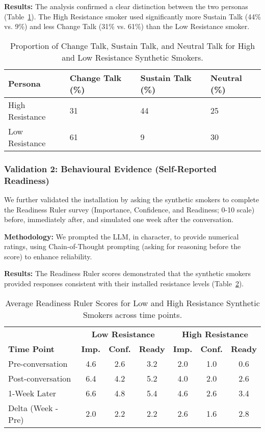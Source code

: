 \textbf{Results:} The analysis confirmed a clear distinction between the two personas (Table~\ref{tab:resistance-ct-st}). The High Resistance smoker used significantly more Sustain Talk (44\% vs. 9\%) and less Change Talk (31\% vs. 61\%) than the Low Resistance smoker.

\begin{table}[h!]
\centering
\caption{Proportion of Change Talk, Sustain Talk, and Neutral Talk for High and Low Resistance Synthetic Smokers.}
\label{tab:resistance-ct-st}
\begin{tabular}{@{}llll@{}}
\toprule
\textbf{Persona} & \textbf{Change Talk (\%)} & \textbf{Sustain Talk (\%)} & \textbf{Neutral (\%)} \\ \midrule
High Resistance & 31 & 44 & 25 \\
Low Resistance & 61 & 9 & 30 \\ \bottomrule
\end{tabular}
\end{table}

\subsubsection{Validation 2: Behavioural Evidence (Self-Reported Readiness)}

We further validated the installation by asking the synthetic smokers to complete the Readiness Ruler survey (Importance, Confidence, and Readiness; 0-10 scale) before, immediately after, and simulated one week after the conversation.

\textbf{Methodology:} We prompted the LLM, in character, to provide numerical ratings, using Chain-of-Thought prompting (asking for reasoning before the score) to enhance reliability.

\textbf{Results:} The Readiness Ruler scores demonstrated that the synthetic smokers provided responses consistent with their installed resistance levels (Table~\ref{tab:resistance-readiness-rulers}).

\begin{table}[h!]
\centering
\caption{Average Readiness Ruler Scores for Low and High Resistance Synthetic Smokers across time points.}
\label{tab:resistance-readiness-rulers}
\begin{tabular}{@{}l|ccc|ccc@{}}
\toprule
 & \multicolumn{3}{c|}{\textbf{Low Resistance}} & \multicolumn{3}{c}{\textbf{High Resistance}} \\
\textbf{Time Point} & \textbf{Imp.} & \textbf{Conf.} & \textbf{Ready} & \textbf{Imp.} & \textbf{Conf.} & \textbf{Ready} \\ \midrule
Pre-conversation & 4.6 & 2.6 & 3.2 & 2.0 & 1.0 & 0.6 \\
Post-conversation & 6.4 & 4.2 & 5.2 & 4.0 & 2.0 & 2.6 \\
1-Week Later & 6.6 & 4.8 & 5.4 & 4.6 & 2.6 & 3.4 \\ \midrule
Delta (Week - Pre) & 2.0 & 2.2 & 2.2 & 2.6 & 1.6 & 2.8 \\ \bottomrule
\end{tabular}
\end{table}

